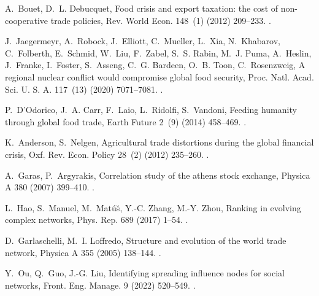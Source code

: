 \documentclass[preprint,3p,times,sort&compress]{elsarticle}
\begin{document}
\begin{thebibliography}{10}
A.~Bouet, D.~L. Debucquet, Food crisis and export taxation: the cost of
  non-cooperative trade policies, Rev. World Econ. 148~(1) (2012) 209--233.
\newblock \href {https://doi.org/10.1007/s10290-011-0108-8}
  {}.

J.~Jaegermeyr, A.~Robock, J.~Elliott, C.~Mueller, L.~Xia, N.~Khabarov,
  C.~Folberth, E.~Schmid, W.~Liu, F.~Zabel, S.~S. Rabin, M.~J. Puma, A.~Heslin,
  J.~Franke, I.~Foster, S.~Asseng, C.~G. Bardeen, O.~B. Toon, C.~Rosenzweig, A
  regional nuclear conflict would compromise global food security, Proc. Natl.
  Acad. Sci. U. S. A. 117~(13) (2020) 7071--7081.
\newblock \href {https://doi.org/10.1073/pnas.1919049117}
  {}.

P.~D'Odorico, J.~A. Carr, F.~Laio, L.~Ridolfi, S.~Vandoni, Feeding humanity
  through global food trade, Earth Future 2~(9) (2014) 458--469.
\newblock \href {https://doi.org/10.1002/2014EF000250}
  {}.

K.~Anderson, S.~Nelgen, Agricultural trade distortions during the global
  financial crisis, Oxf. Rev. Econ. Policy 28~(2) (2012) 235--260.
\newblock \href {https://doi.org/10.1093/oxrep/grs001}
  {}.

A.~Garas, P.~Argyrakis, Correlation study of the athens stock exchange, Physica
  A 380 (2007) 399--410.
\newblock \href {https://doi.org/10.1016/j.physa.2007.02.097}
  {}.

L.~Hao, S.~Manuel, M.~Mat{\'u}\u{s}, Y.-C. Zhang, M.-Y. Zhou, Ranking in
  evolving complex networks, Phys. Rep. 689 (2017) 1--54.
\newblock \href {https://doi.org/10.1016/j.physrep.2017.05.001}
  {}.

D.~Garlaschelli, M.~I. Loffredo, Structure and evolution of the world trade
  network, Physica A 355 (2005) 138--144.
\newblock \href {https://doi.org/10.1016/j.physa.2005.02.075}
  {}.

Y.~Ou, Q.~Guo, J.-G. Liu, Identifying spreading influence nodes for social
  networks, Front. Eng. Manage. 9 (2022) 520--549.
\newblock \href {https://doi.org/10.1007/s42524-022-0190-8}
  {}.


\end{thebibliography}
\end{document}
